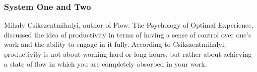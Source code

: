 \subsubsection{System One and Two}










%

%



Mihaly Csikszentmihalyi, author of Flow: The Psychology of Optimal Experience, discussed the idea of productivity in terms of having a sense of control over one's work and the ability to engage in it fully. According to Csikszentmihalyi, productivity is not about working hard or long hours, but rather about achieving a state of flow in which you are completely absorbed in your work.






